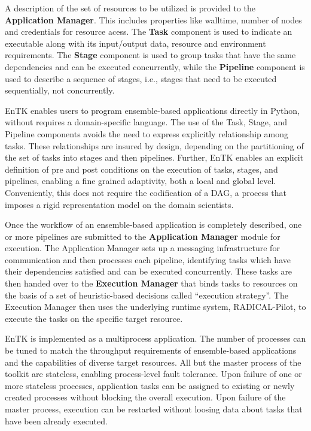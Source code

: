 A description of the set of resources to be utilized is provided to the 
\textbf{Application Manager}. This includes properties like walltime, number of
nodes and credentials for resource acess. The \textbf{Task} component is used to
indicate an executable along with its input/output data, resource and 
environment requirements. The \textbf{Stage} component is used to group
tasks that have the same dependencies and can be executed concurrently, while
the \textbf{Pipeline} component is used to describe a sequence of stages,
i.e., stages that need to be executed sequentially, not concurrently.

EnTK enables users to program ensemble-based applications directly in Python,
without requires a domain-specific language. The use of the Task, Stage, and
Pipeline components avoids the need to express explicitly relationship among
tasks. These relationships are insured by design, depending on the
partitioning of the set of tasks into stages and then pipelines. Further,
EnTK enables an explicit definition of pre and post conditions on the
execution of tasks, stages, and pipelines, enabling a fine grained
adaptivity, both a local and global level. Conveniently, this does not
require the codification of a DAG, a process that imposes a rigid
representation model on the domain scientists.

Once the workflow of an ensemble-based application is completely described,
one or more pipelines are submitted to the \textbf{Application Manager}
module for execution. The Application Manager sets up a messaging
infrastructure for communication and then processes each pipeline,
identifying tasks which have their dependencies satisfied and can be executed
concurrently. These tasks are then handed over to the \textbf{Execution
Manager} that binds tasks to resources on the basis of a set of
heuristic-based decisions called ``execution strategy''. The Execution Manager
then uses the underlying runtime system, RADICAL-Pilot, to execute the tasks
on the specific target resource.

EnTK is implemented as a multiprocess application. The number of processes
can be tuned to match the throughput requirements of ensemble-based
applications and the capabilities of diverse target resources. All but the
master process of the toolkit are stateless, enabling process-level fault
tolerance. Upon failure of one or more stateless processes, application tasks
can be assigned to existing or newly created processes without blocking the
overall execution. Upon failure of the master process, execution can be
restarted without loosing data about tasks that have been already executed.


